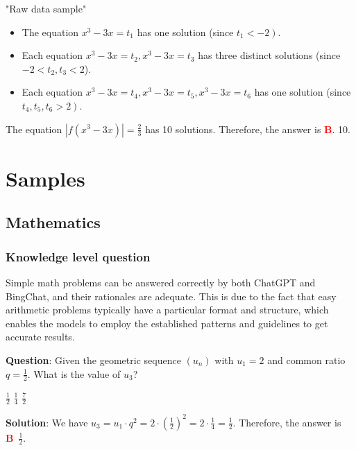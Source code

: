 \documentclass{article}
\begin{document}
{\begin{ProblemSpecBox}{"Raw data sample"}
\begin{multicols}{2}
\begin{itemize}
				\item The equation $x^{3}-3x=t_{1}$ has one solution (since $\left.t_{1}<-2\right)$.
				\item Each equation $x^{3}-3x=t_{2}, x^{3}-3x=t_{3}$ has three distinct solutions (since $-2<t_{2}, t_{3}<2$). 
				\item Each equation $x^{3}-3x=t_{4}, x^{3}-3x=t_{5}, x^{3}-3x=t_{6}$ has one solution (since $\left.t_{4}, t_{5}, t_{6}>2\right)$. 
			\end{itemize}
			The equation $\left|f\left(x^{3}-3 x\right)\right|=\frac{2}{3}$ has 10 solutions. Therefore, the answer is \textcolor{red}{\textbf{B}}. 10. 		
		\end{multicols}	
		
		
		
	\end{ProblemSpecBox}
	
	\newpage	
	\section{Samples} 
	\label{Dataset_response}
	
	\subsection{Mathematics} 
	\label{VNHSGE_Math}
	
	\subsubsection{Knowledge level question}
	\label{VNHSGE_Math_K}
	
	Simple math problems can be answered correctly by both ChatGPT and BingChat, and their rationales are adequate. This is due to the fact that easy arithmetic problems typically have a particular format and structure, which enables the models to employ the established patterns and guidelines to get accurate results.  
	
	\begin{mdframed}[linewidth=1pt,linecolor=red] \textbf{Question}: Given the geometric sequence $(u_n)$ with $u_1=2$ and common ratio $q=\frac{1}{2}$. What is the value of $u_3$?
		
		\begin{oneparchoices}
			\choice $\frac{1}{2}$
			\choice $\frac{1}{4}$
			\choice $\frac{7}{2}$
		\end{oneparchoices}
		
		\textbf{Solution}: We have $u_3 = u_1 \cdot q^2 = 2 \cdot (\frac{1}{2})^2 = 2 \cdot \frac{1}{4} = \frac{1}{2}$. Therefore, the answer is \textcolor{red}{\textbf{B}}~$\frac{1}{2}$.
		

\end{mdframed}}
\end{document}
